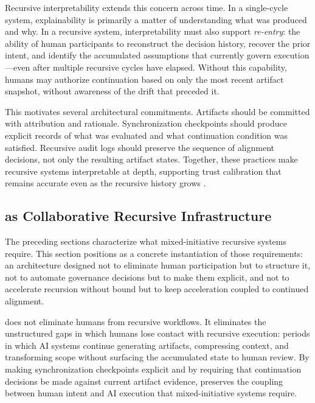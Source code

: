 Recursive interpretability extends this concern across time. In a single-cycle system, explainability is primarily a matter of understanding what was produced and why. In a recursive system, interpretability must also support \textit{re-entry}: the ability of human participants to reconstruct the decision history, recover the prior intent, and identify the accumulated assumptions that currently govern execution---even after multiple recursive cycles have elapsed. Without this capability, humans may authorize continuation based on only the most recent artifact snapshot, without awareness of the drift that preceded it.

This motivates several architectural commitments. Artifacts should be committed with attribution and rationale. Synchronization checkpoints should produce explicit records of what was evaluated and what continuation condition was satisfied. Recursive audit logs should preserve the sequence of alignment decisions, not only the resulting artifact states. Together, these practices make recursive systems interpretable at depth, supporting trust calibration that remains accurate even as the recursive history grows \cite{Wiener1948Cybernetics,Lamport1978TimeClocks}.

\subsection{ as Collaborative Recursive Infrastructure}

The preceding sections characterize what mixed-initiative recursive systems require. This section positions  as a concrete instantiation of those requirements: an architecture designed not to eliminate human participation but to structure it, not to automate governance decisions but to make them explicit, and not to accelerate recursion without bound but to keep acceleration coupled to continued alignment.

 does not eliminate humans from recursive workflows. It eliminates the unstructured gaps in which humans lose contact with recursive execution: periods in which AI systems continue generating artifacts, compressing context, and transforming scope without surfacing the accumulated state to human review. By making synchronization checkpoints explicit and by requiring that continuation decisions be made against current artifact evidence,  preserves the coupling between human intent and AI execution that mixed-initiative systems require.

